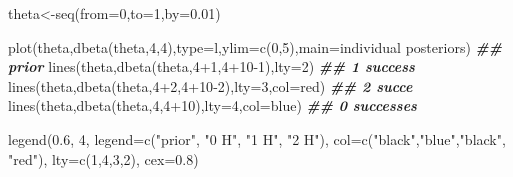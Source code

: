 \documentclass[
]{book}
\newenvironment{Shaded}{\begin{snugshade}}{\end{snugshade}}
\newcommand{\AttributeTok}[1]{\textcolor[rgb]{0.77,0.63,0.00}{#1}}
\newcommand{\DecValTok}[1]{\textcolor[rgb]{0.00,0.00,0.81}{#1}}
\newcommand{\DocumentationTok}[1]{\textcolor[rgb]{0.56,0.35,0.01}{\textbf{\textit{#1}}}}
\newcommand{\FloatTok}[1]{\textcolor[rgb]{0.00,0.00,0.81}{#1}}
\newcommand{\FunctionTok}[1]{\textcolor[rgb]{0.00,0.00,0.00}{#1}}
\newcommand{\NormalTok}[1]{#1}
\newcommand{\OtherTok}[1]{\textcolor[rgb]{0.56,0.35,0.01}{#1}}
\newcommand{\SpecialCharTok}[1]{\textcolor[rgb]{0.00,0.00,0.00}{#1}}
\newcommand{\StringTok}[1]{\textcolor[rgb]{0.31,0.60,0.02}{#1}}
\theoremstyle{definition}
\theoremstyle{definition}
\theoremstyle{definition}
\theoremstyle{definition}
\theoremstyle{remark}
\begin{document}
\begin{Shaded}
\begin{Highlighting}[]
\NormalTok{ theta}\OtherTok{\textless{}{-}}\FunctionTok{seq}\NormalTok{(}\AttributeTok{from=}\DecValTok{0}\NormalTok{,}\AttributeTok{to=}\DecValTok{1}\NormalTok{,}\AttributeTok{by=}\FloatTok{0.01}\NormalTok{)}

 \FunctionTok{plot}\NormalTok{(theta,}\FunctionTok{dbeta}\NormalTok{(theta,}\DecValTok{4}\NormalTok{,}\DecValTok{4}\NormalTok{),}\AttributeTok{type=}\StringTok{\textquotesingle{}l\textquotesingle{}}\NormalTok{,}\AttributeTok{ylim=}\FunctionTok{c}\NormalTok{(}\DecValTok{0}\NormalTok{,}\DecValTok{5}\NormalTok{),}\AttributeTok{main=}\StringTok{\textquotesingle{}individual posteriors\textquotesingle{}}\NormalTok{) }\DocumentationTok{\#\# prior}
 \FunctionTok{lines}\NormalTok{(theta,}\FunctionTok{dbeta}\NormalTok{(theta,}\DecValTok{4}\SpecialCharTok{+}\DecValTok{1}\NormalTok{,}\DecValTok{4}\SpecialCharTok{+}\DecValTok{10{-}1}\NormalTok{),}\AttributeTok{lty=}\DecValTok{2}\NormalTok{) }\DocumentationTok{\#\# 1 success}
   \FunctionTok{lines}\NormalTok{(theta,}\FunctionTok{dbeta}\NormalTok{(theta,}\DecValTok{4}\SpecialCharTok{+}\DecValTok{2}\NormalTok{,}\DecValTok{4}\SpecialCharTok{+}\DecValTok{10{-}2}\NormalTok{),}\AttributeTok{lty=}\DecValTok{3}\NormalTok{,}\AttributeTok{col=}\StringTok{\textquotesingle{}red\textquotesingle{}}\NormalTok{) }\DocumentationTok{\#\# 2 succe}
   \FunctionTok{lines}\NormalTok{(theta,}\FunctionTok{dbeta}\NormalTok{(theta,}\DecValTok{4}\NormalTok{,}\DecValTok{4}\SpecialCharTok{+}\DecValTok{10}\NormalTok{),}\AttributeTok{lty=}\DecValTok{4}\NormalTok{,}\AttributeTok{col=}\StringTok{\textquotesingle{}blue\textquotesingle{}}\NormalTok{)  }\DocumentationTok{\#\# 0 successes}
   
  \FunctionTok{legend}\NormalTok{(}\FloatTok{0.6}\NormalTok{, }\DecValTok{4}\NormalTok{, }
         \AttributeTok{legend=}\FunctionTok{c}\NormalTok{(}\StringTok{"prior"}\NormalTok{, }\StringTok{"0 H"}\NormalTok{, }\StringTok{"1 H"}\NormalTok{, }\StringTok{"2 H"}\NormalTok{),}
       \AttributeTok{col=}\FunctionTok{c}\NormalTok{(}\StringTok{"black"}\NormalTok{,}\StringTok{"blue"}\NormalTok{,}\StringTok{"black"}\NormalTok{, }\StringTok{"red"}\NormalTok{), }\AttributeTok{lty=}\FunctionTok{c}\NormalTok{(}\DecValTok{1}\NormalTok{,}\DecValTok{4}\NormalTok{,}\DecValTok{3}\NormalTok{,}\DecValTok{2}\NormalTok{), }\AttributeTok{cex=}\FloatTok{0.8}\NormalTok{)}
\end{Highlighting}
\end{Shaded}
\end{document}
